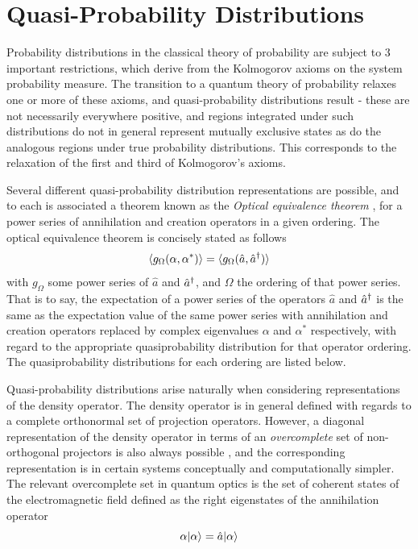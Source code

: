 
\section{Quasi-Probability Distributions}
Probability distributions in the classical theory of probability are subject to 3 important restrictions, which derive from the Kolmogorov axioms on the system probability measure. The transition to a quantum theory of probability relaxes one or more of these axioms, and quasi-probability distributions result - these are not necessarily everywhere positive, and regions integrated under such distributions do not in general represent mutually exclusive states as do the analogous regions under true probability distributions. This corresponds to the relaxation of the first and third of Kolmogorov's axioms. 

Several different quasi-probability distribution representations are possible\autocite{Walls2008}, and to each is associated a theorem known as the \emph{Optical equivalence theorem} \autocite{Sudarshan1963}, for a power series of annihilation and creation operators in a given ordering. The optical equivalence theorem is concisely stated as follows
\begin{equation}
	\langle g_{\Omega} (\alpha, \alpha^*) \rangle = \langle g_{\Omega} (\hat{a}, \hat{a}^\dagger) \rangle
\end{equation}
with $g_\Omega$ some power series of $\hat{a}$ and $\hat{a}^\dagger$, and $\Omega$ the ordering of that power series. That is to say, the expectation of a power series of the operators $\hat{a}$ and $\hat{a}^\dagger$ is the same as the expectation value of the same power series with annihilation and creation operators replaced by complex eigenvalues $\alpha$ and $\alpha^*$ respectively, with regard to the appropriate quasiprobability distribution for that operator ordering. The quasiprobability distributions for each ordering are listed below.

Quasi-probability distributions arise naturally when considering representations of the density operator. The density operator is in general defined with regards to a complete orthonormal set of projection operators. However, a diagonal representation of the density operator in terms of an \emph{overcomplete} set of non-orthogonal projectors is also always possible \autocite{Sudarshan1963}, and the corresponding representation is in certain systems conceptually and computationally simpler. The relevant overcomplete set in quantum optics is the set of coherent states of the electromagnetic field defined as the right eigenstates of the annihilation operator
\begin{equation}
\alpha | \alpha \rangle = \hat{a} | \alpha \rangle
\end{equation}
